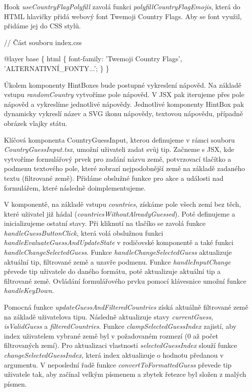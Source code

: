 Hook \emph{useCountryFlagPolyfill} zavolá funkci \emph{polyfillCountryFlagEmojis}, která do HTML hlavičky přidá webový font Twemoji Country Flags. Aby se font využil, přidáme jej do CSS stylů.

\begin{prog}
// Část souboru index.css

@layer base \{
  html \{
    font-family: 'Twemoji Country Flags', 'ALTERNATIVNÍ_FONTY...';
  \}
\}
\end{prog}

Úkolem komponenty HintBoxes bude postupné vykreslení nápověd. Na základě vstupu \emph{randomCountry} vytvoříme pole nápověd. V JSX pak iterujeme přes pole nápověd a vykreslíme jednotlivé nápovědy. 
Jednotlivé komponenty HintBox pak dynamicky vykreslí název a SVG ikonu nápovědy, textovou nápovědu, případně obrázek vlajky státu.

Klíčová komponenta CountryGuessInput, kterou definujeme v rámci souboru \emph{CountryGuessInput.tsx}, umožní uživateli zadat svůj tip. 
Začneme s JSX, kde vytvoříme formulářový prvek pro zadání názvu země, potvrzovací tlačítko a podmenu textového pole, které zobrazí nejpodobnější země na základě zadaného textu (filtrované země). 
Přidáme obslužné funkce pro akce a události nad formulářem, které následně doimplementujeme.

V komponentě, na základě vstupu \emph{countries}, získáme pole všech zemí bez těch, které uživatel již hádal (\emph{countriesWithoutAlreadyGuessed}). Poté definujeme a inicializujeme ostatní stavy. 
Při kliknutí na tlačíko se zavolá funkce \emph{handleGuessButtonClick}, která volá obslužnou funkci \emph{handleEvaluateGuessAndUpdateState} v rodičovské komponentě a také funkci \emph{handleChangeSelectedGuess}. 
Funkce \emph{handleChangeSelectedGuess} aktualizuje aktuální tip, filtrované země a uzavře podmenu. Funkce \emph{handleInputChange} převede tip uživatele do daného formátu, poté aktualizuje aktuální tip a filtrované země. 
Ovládání formulářového prvku pomocí klávesnice umožní funkce \emph{handleKeyDown}.

Pomocná funkce \emph{updateGuessAndFilteredCountries} získá aktuálně filtrované země na základě uživatelova tipu. Následně aktualizuje stavy \emph{currentGuess}, \emph{isValidGuess} a \emph{filteredCountries}. 
Funkce \emph{clampSelectedGuessIndex} zajistí, aby index uživatelem vybrané země byl v požadovaném rozmezí (0 až počet filtrovaných zemí). 
Pro aktualizaci vlastnosti \emph{selectedGuessIndex} slouží funkce \emph{changeSelectedGuessIndex}, která index aktualizuje o hodnotu předanou v argumentu.
V neposlední řadě funkce \emph{convertToFormattedGuess} převede tip uživatele tak, aby začínal velkým písmenem a zbytek řetezce byl složen z malých písmen.

